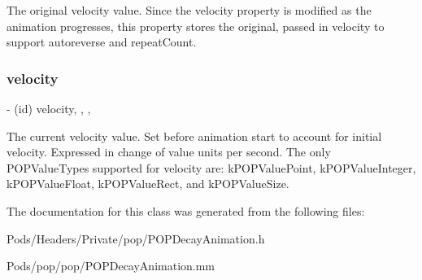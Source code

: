 The original velocity value.  Since the velocity property is modified as the animation progresses, this property stores the original, passed in velocity to support autoreverse and repeat\+Count. \mbox{\label{interface_p_o_p_decay_animation_a73bb560f604b2c19ee9f310d9b2a93d3}} 
\subsubsection{\texorpdfstring{velocity}{velocity}}
{\footnotesize\ttfamily -\/ (id) velocity\hspace{0.3cm}{\ttfamily [read]}, {\ttfamily [write]}, {\ttfamily [nonatomic]}, {\ttfamily [copy]}}

The current velocity value.  Set before animation start to account for initial velocity. Expressed in change of value units per second. The only P\+O\+P\+Value\+Types supported for velocity are\+: k\+P\+O\+P\+Value\+Point, k\+P\+O\+P\+Value\+Integer, k\+P\+O\+P\+Value\+Float, k\+P\+O\+P\+Value\+Rect, and k\+P\+O\+P\+Value\+Size. 

The documentation for this class was generated from the following files\+:\begin{DoxyCompactItemize}
\item 
Pods/\+Headers/\+Private/pop/P\+O\+P\+Decay\+Animation.\+h\item 
Pods/pop/pop/P\+O\+P\+Decay\+Animation.\+mm\end{DoxyCompactItemize}
